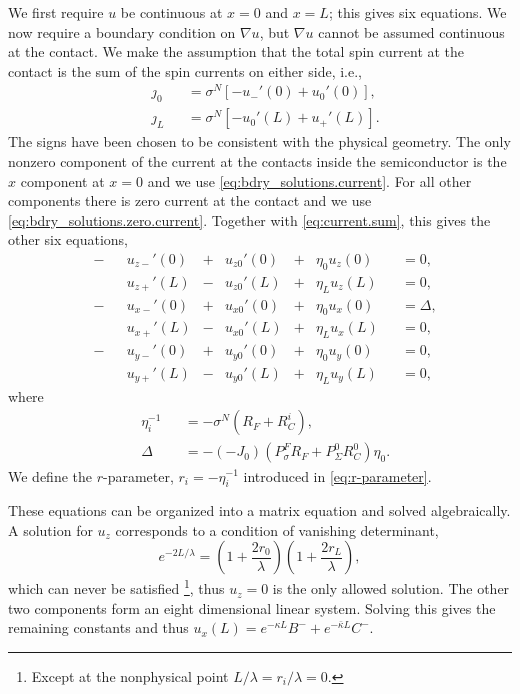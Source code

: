 We first require $u$ be continuous at $x = 0$ and $x = L$; this gives six equations.
We now require a boundary condition on $∇u$, but $∇u$ cannot be assumed continuous at the contact.
We make the assumption that the total spin current at the contact
is the sum of the spin currents on either side, i.e.,
\begin{subequations}
  \label{eq:current.sum}
  \begin{alignat}{2}
    & ȷ_0 && = σ^N \left[ - u_-'(0) + u_0'(0) \right] , \\
    & ȷ_L && = σ^N \left[ - u_0'(L) + u_+'(L) \right] .
  \end{alignat}
\end{subequations}
The signs have been chosen to be consistent with the physical geometry.
The only nonzero component of the current at the contacts inside the semiconductor
is the $x$ component at $x = 0$ and we use \cref{eq:bdry_solutions.current}.
For all other components there is zero current at the contact and we use
\cref{eq:bdry_solutions.zero.current}.
Together with \cref{eq:current.sum}, this gives the other six equations,
\begin{subequations}
  \begin{alignat}{8}
    & - & {} & u_{z-}'(0) & {}+{} & u_{z0}'(0) & {}+{} & η_0 u_z(0) && = 0 , \\
    &   & {} & u_{z+}'(L) & {}-{} & u_{z0}'(L) & {}+{} & η_L u_z(L) && = 0 , \\
    & - & {} & u_{x-}'(0) & {}+{} & u_{x0}'(0) & {}+{} & η_0 u_x(0) && = Δ , \\
    &   & {} & u_{x+}'(L) & {}-{} & u_{x0}'(L) & {}+{} & η_L u_x(L) && = 0 , \\
    & - & {} & u_{y-}'(0) & {}+{} & u_{y0}'(0) & {}+{} & η_0 u_y(0) && = 0 , \\
    &   & {} & u_{y+}'(L) & {}-{} & u_{y0}'(L) & {}+{} & η_L u_y(L) && = 0 ,
  \end{alignat}
\end{subequations}
where
\begin{subequations}
  \begin{alignat}{2}
  & η_i^{-1} && = - σ^N \left( R_F + R_C^i \right) , \\
  & Δ && = - (- J_0) \left( P_σ^F R_F + P_Σ^0 R_C^0 \right) η_0 .
  \end{alignat}
\end{subequations}
We define the $r$-parameter, $r_i = - η_i^{-1}$ introduced in \cref{eq:r-parameter}.

These equations can be organized into a matrix equation and solved algebraically.
A solution for $u_z$ corresponds to a condition of vanishing determinant,
\begin{equation}
  e^{-2 L / λ} = \left( 1 + \frac{2 r_0}{λ} \right) \left( 1 + \frac{2 r_L}{λ} \right) ,
\end{equation}
which can never be satisfied
\footnote{
  Except at the nonphysical point $L / λ = r_i / λ = 0$.
},
thus $u_z = 0$ is the only allowed solution.
The other two components form an eight dimensional linear system.
Solving this gives the remaining constants and thus
$u_x (L) = e^{- κ L} B^- + e^{- \bar{κ} L} C^-$.

